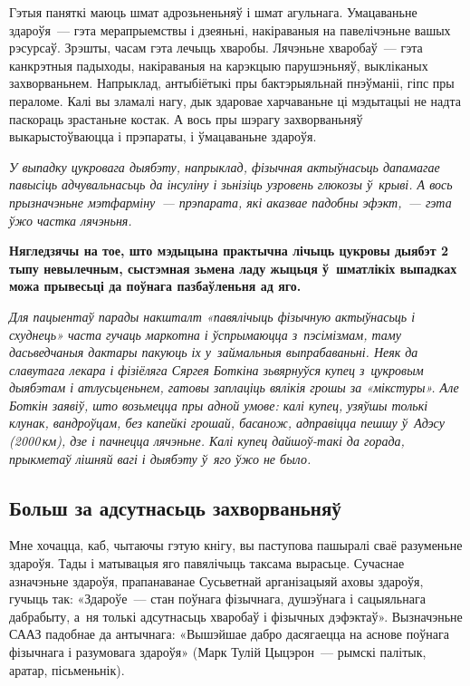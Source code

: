Гэтыя паняткі маюць шмат адрозьненьняў і шмат агульнага. Умацаваньне здароўя~--- гэта мерапрыемствы і дзеяньні, накіраваныя на павелічэньне вашых рэсурсаў. Зрэшты, часам гэта лечыць хваробы. Лячэньне хваробаў~--- гэта канкрэтныя падыходы, накіраваныя на карэкцыю парушэньняў, выкліканых захворваньнем. Напрыклад, антыбіётыкі пры бактэрыяльнай пнэўманіі, гіпс пры пераломе. Калі вы зламалі нагу, дык здаровае харчаваньне ці мэдытацыі не надта паскораць зрастаньне костак. А вось пры шэрагу захворваньняў выкарыстоўваюцца і прэпараты, і ўмацаваньне здароўя.

\emph{У выпадку цукровага дыябэту, напрыклад, фізычная актыўнасьць дапамагае павысіць адчувальнасьць да інсуліну і зьнізіць узровень глюкозы ў~крыві. А вось прызначэньне мэтфарміну~--- прэпарата, які аказвае падобны эфэкт,~--- гэта ўжо частка лячэньня.} 

\textbf{Нягледзячы на тое, што мэдыцына практычна лічыць цукровы дыябэт 2 тыпу невылечным, сыстэмная зьмена ладу жыцьця ў~шматлікіх выпадках можа прывесьці да поўнага пазбаўленьня ад яго.}

\emph{Для пацыентаў парады накшталт «павялічыць фізычную актыўнасьць і схуднець» часта гучаць маркотна і ўспрымаюцца з~пэсімізмам, таму дасьведчаныя дактары пакуюць іх у~займальныя выпрабаваньні. Неяк да славутага лекара і фізіёляга Сяргея Боткіна зьвярнуўся купец з~цукровым дыябэтам і атлусьценьнем, гатовы заплаціць вялікія грошы за «мікстуры». Але Боткін заявіў, што возьмецца пры адной умове: калі купец, узяўшы толькі клунак, вандроўцам, без капейкі грошай, басанож, адправіцца пешшу ў~Адэсу (2000\,км), дзе і пачнецца лячэньне. Калі купец дайшоў-такі да горада, прыкметаў лішняй вагі і дыябэту ў~яго ўжо не было.}


\subsection*{Больш за адсутнасьць захворваньняў} 

Мне хочацца, каб, чытаючы гэтую кнігу, вы паступова пашыралі сваё разуменьне здароўя. Тады і матывацыя яго павялічыць таксама вырасьце. Сучаснае азначэньне здароўя, прапанаванае Сусьветнай арганізацыяй аховы здароўя, гучыць так: «Здароўе~--- стан поўнага фізычнага, душэўнага і сацыяльнага дабрабыту, а~ня толькі адсутнасьць хваробаў і фізычных дэфэктаў». Вызначэньне СААЗ падобнае да антычнага: «Вышэйшае дабро дасягаецца на аснове поўнага фізычнага і разумовага здароўя» (Марк Тулій Цыцэрон~--- рымскі палітык, аратар, пісьменьнік).

